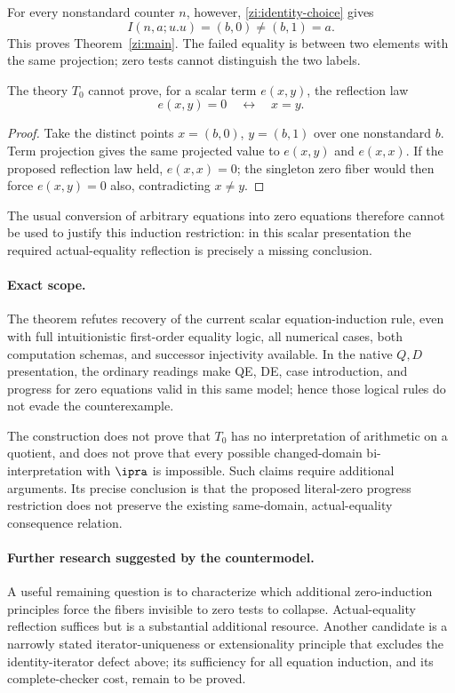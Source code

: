 For every nonstandard counter \(n\), however, \eqref{zi:identity-choice} gives
\[
I(n,a;u.u)=(b,0)\ne(b,1)=a.
\]
This proves Theorem~\ref{zi:main}. The failed equality is between two elements with the same projection; zero tests cannot distinguish the two labels.

\begin{corollary}
\label{zi:no-reflection}
The theory \(T_0\) cannot prove, for a scalar term \(e(x,y)\), the reflection law
\[
e(x,y)=0\quad\longleftrightarrow\quad x=y.
\]
\end{corollary}
\begin{proof}
Take the distinct points \(x=(b,0)\), \(y=(b,1)\) over one nonstandard \(b\). Term projection gives the same projected value to \(e(x,y)\) and \(e(x,x)\). If the proposed reflection law held, \(e(x,x)=0\); the singleton zero fiber would then force \(e(x,y)=0\) also, contradicting \(x\ne y\).
\end{proof}

The usual conversion of arbitrary equations into zero equations therefore cannot be used to justify this induction restriction: in this scalar presentation the required actual-equality reflection is precisely a missing conclusion.

\paragraph{Exact scope.}
The theorem refutes recovery of the current scalar equation-induction rule, even with full intuitionistic first-order equality logic, all numerical cases, both computation schemas, and successor injectivity available. In the native \(Q,D\) presentation, the ordinary readings make QE, DE, case introduction, and progress for zero equations valid in this same model; hence those logical rules do not evade the counterexample.

The construction does not prove that \(T_0\) has no interpretation of arithmetic on a quotient, and does not prove that every possible changed-domain bi-interpretation with \(\ipra\) is impossible. Such claims require additional arguments. Its precise conclusion is that the proposed literal-zero progress restriction does not preserve the existing same-domain, actual-equality consequence relation.

\paragraph{Further research suggested by the countermodel.}
A useful remaining question is to characterize which additional zero-induction principles force the fibers invisible to zero tests to collapse. Actual-equality reflection suffices but is a substantial additional resource. Another candidate is a narrowly stated iterator-uniqueness or extensionality principle that excludes the identity-iterator defect above; its sufficiency for all equation induction, and its complete-checker cost, remain to be proved.

